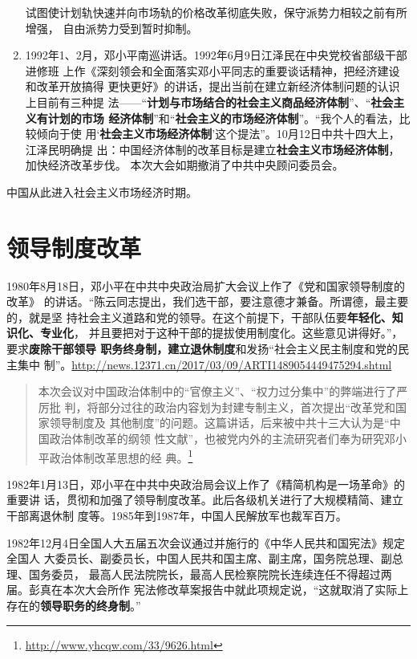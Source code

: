 \begin{enumerate}
  试图使计划轨快速并向市场轨的价格改革彻底失败，保守派势力相较之前有所增强，
  自由派势力受到暂时抑制。

\item 1992年1、2月，邓小平南巡讲话。1992年6月9日江泽民在中央党校省部级干部进修班
  上作《深刻领会和全面落实邓小平同志的重要谈话精神，把经济建设和改革开放搞得
  更快更好》的讲话，提出当前在建立新经济体制问题的认识上目前有三种提
  法——“\textbf{计划与市场结合的社会主义商品经济体制}”、“\textbf{社会主义有计划的市场
    经济体制}”和“\textbf{社会主义的市场经济体制}”。“我个人的看法，比较倾向于使
  用‘\textbf{社会主义市场经济体制}’这个提法”。10月12日中共十四大上，江泽民明确提
  出：中国经济体制的改革目标是建立\textbf{社会主义市场经济体制}，加快经济改革步伐。
  本次大会如期撤消了中共中央顾问委员会。
\end{enumerate}

中国从此进入社会主义市场经济时期。

\section{领导制度改革}

1980年8月18日，邓小平在中共中央政治局扩大会议上作了《党和国家领导制度的改革》
的讲话。“陈云同志提出，我们选干部，要注意德才兼备。所谓德，最主要的，就是坚
持社会主义道路和党的领导。在这个前提下，干部队伍要\textbf{年轻化、知识化、专业化}，
并且要把对于这种干部的提拔使用制度化。这些意见讲得好。”，要求\textbf{废除干部领导
  职务终身制，建立退休制度}和发扬“社会主义民主制度和党的民主集中
制”。\url{http://news.12371.cn/2017/03/09/ARTI1489054449475294.shtml}
\begin{quotation}
  本次会议对中国政治体制中的“官僚主义”、“权力过分集中”的弊端进行了严厉批
  判，将部分过往的政治内容划为封建专制主义，首次提出“改革党和国家领导制度及
  其他制度”的问题。这篇讲话，后来被中共十三大认为是“中国政治体制改革的纲领
  性文献”，也被党内外的主流研究者们奉为研究邓小平政治体制改革思想的经
  典。\footnote{\url{http://www.yhcqw.com/33/9626.html}}
\end{quotation}

1982年1月13日，邓小平在中共中央政治局会议上作了《精简机构是一场革命》的重要讲
话，贯彻和加强了领导制度改革。此后各级机关进行了大规模精简、建立干部离退休制
度等。1985年到1987年，中国人民解放军也裁军百万。

1982年12月4日全国人大五届五次会议通过并施行的《中华人民共和国宪法》规定全国人
大委员长、副委员长，中国人民共和国主席、副主席，国务院总理、副总理、国务委员，
最高人民法院院长，最高人民检察院院长连续连任不得超过两届。彭真在本次大会所作
宪法修改草案报告中就此项规定说，“这就取消了实际上存在的\textbf{领导职务的终身制}。”


